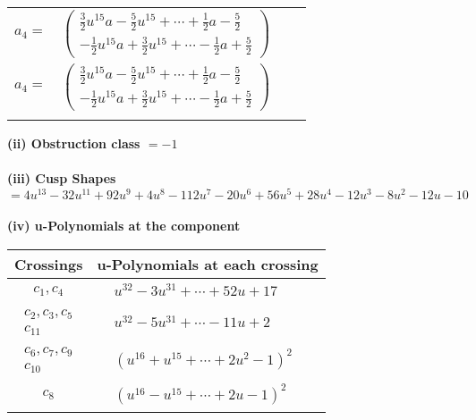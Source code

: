 \documentclass[1p]{elsarticle_modified}
\theoremstyle{definition}
\begin{document}
\begin{tabular}{m{7pt} m{180pt} m{7pt} m{180pt} }
\flushright $a_{4}=$&$\begin{pmatrix}\frac{3}{2} u^{15} a-\frac{5}{2} u^{15}+\cdots+\frac{1}{2} a-\frac{5}{2}\\-\frac{1}{2} u^{15} a+\frac{3}{2} u^{15}+\cdots-\frac{1}{2} a+\frac{5}{2}\end{pmatrix}$\\ \flushright $a_{4}=$&$\begin{pmatrix}\frac{3}{2} u^{15} a-\frac{5}{2} u^{15}+\cdots+\frac{1}{2} a-\frac{5}{2}\\-\frac{1}{2} u^{15} a+\frac{3}{2} u^{15}+\cdots-\frac{1}{2} a+\frac{5}{2}\end{pmatrix}$\\&\end{tabular}
\flushleft \textbf{(ii) Obstruction class $= -1$}\\~\\
\flushleft \textbf{(iii) Cusp Shapes $= 4 u^{13}-32 u^{11}+92 u^9+4 u^8-112 u^7-20 u^6+56 u^5+28 u^4-12 u^3-8 u^2-12 u-10$}\\~\\
\newpage\renewcommand{\arraystretch}{1}
\flushleft \textbf{(iv) u-Polynomials at the component}\newline \\
\begin{tabular}{m{50pt}|m{274pt}}
Crossings & \hspace{64pt}u-Polynomials at each crossing \\
\hline $$\begin{aligned}c_{1},c_{4}\end{aligned}$$&$\begin{aligned}
&u^{32}-3 u^{31}+\cdots+52 u+17
\end{aligned}$\\
\hline $$\begin{aligned}c_{2},c_{3},c_{5}\\c_{11}\end{aligned}$$&$\begin{aligned}
&u^{32}-5 u^{31}+\cdots-11 u+2
\end{aligned}$\\
\hline $$\begin{aligned}c_{6},c_{7},c_{9}\\c_{10}\end{aligned}$$&$\begin{aligned}
&(u^{16}+u^{15}+\cdots+2 u^2-1)^{2}
\end{aligned}$\\
\hline $$\begin{aligned}c_{8}\end{aligned}$$&$\begin{aligned}
&(u^{16}- u^{15}+\cdots+2 u-1)^{2}
\end{aligned}$\\
\hline
\end{tabular}\\~\\
\end{document}
